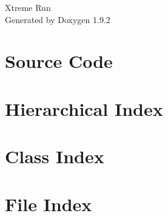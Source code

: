 \documentclass[twoside]{book}
\newcommand{\+}{\discretionary{\mbox{\scriptsize$\hookleftarrow$}}{}{}}
\newcommand{\clearemptydoublepage}{%
    \newpage{\pagestyle{empty}\cleardoublepage}%
  }
\begin{document}
  \raggedbottom
    \hypersetup{pageanchor=false,
                bookmarksnumbered=true,
                pdfencoding=unicode
               }
  \begin{titlepage}
  \vspace*{7cm}
  \begin{center}%
  {\Large Xtreme Run}\\
  \vspace*{1cm}
  {\large Generated by Doxygen 1.9.2}\\
  \end{center}
  \end{titlepage}
  \clearemptydoublepage
  \tableofcontents
  \clearemptydoublepage
  \hypersetup{pageanchor=true}
\chapter{Source Code}
\label{md_src__r_e_a_d_m_e}

\chapter{Hierarchical Index}

\chapter{Class Index}

\chapter{File Index}

\end{document}
